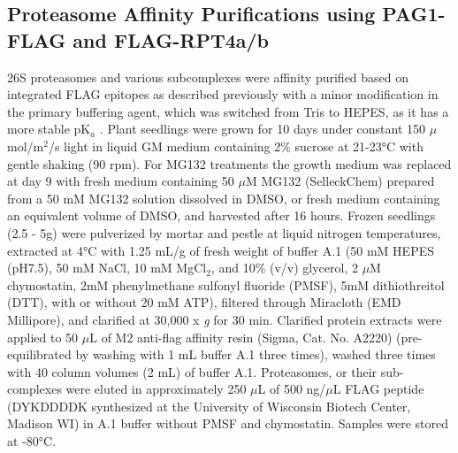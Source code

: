 \subsection{Proteasome Affinity Purifications using PAG1-FLAG and FLAG-RPT4a/b}
	26S proteasomes and various subcomplexes were affinity purified based on integrated FLAG epitopes as described previously with a minor modification in the primary buffering agent, which was switched from Tris to HEPES, as it has a more stable pK$_{a}$ \citep{book10, marshall17}. Plant seedlings were grown for 10 days under constant 150 $\mu$mol/m$^{2}$/s light in liquid GM medium containing 2\% sucrose at 21-23°C with gentle shaking (90 rpm). For MG132 treatments the growth medium was replaced at day 9 with fresh medium containing 50 $\mu$M MG132 (SelleckChem) prepared from a 50 mM MG132 solution dissolved in DMSO, or fresh medium containing an equivalent volume of DMSO, and harvested after 16 hours. Frozen seedlings (2.5 - 5g) were pulverized by mortar and pestle at liquid nitrogen temperatures, extracted at 4°C with 1.25 mL/g of fresh weight of buffer A.1 (50 mM HEPES (pH7.5), 50 mM NaCl, 10 mM MgCl$_{2}$, and 10\%  (v/v) glycerol, 2 $\mu$M chymostatin, 2mM phenylmethane sulfonyl fluoride (PMSF), 5mM dithiothreitol (DTT), with or without 20 mM ATP), filtered through Miracloth (EMD Millipore), and clarified at 30,000 x \textit{g} for 30 min. Clarified protein extracts were applied to 50 $\mu$L of M2 anti-flag affinity resin (Sigma, Cat. No. A2220) (pre-equilibrated by washing with 1 mL buffer A.1 three times), washed three times with 40 column volumes (2 mL) of buffer A.1. Proteasomes, or their sub-complexes were eluted in approximately 250 $\mu$L of 500 ng/$\mu$L FLAG peptide (DYKDDDDK synthesized at the University of Wisconsin Biotech Center, Madison WI) in A.1 buffer without PMSF and chymostatin. Samples were stored at -80°C.
	

